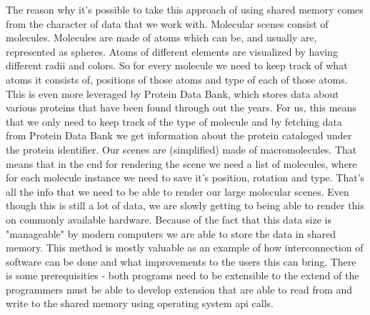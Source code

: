 \documentclass[
  digital, %
  table,   %
  lof,     %
  lot,     %
]{fithesis3}
\begin{document}
The reason why it's possible to take this approach of using shared memory comes from the character of data that we work with. Molecular scenes consist of molecules. Molecules are made of atoms which can be, and usually are, represented as spheres. Atoms of different elements are visualized by having different radii and colors. So for every molecule we need to keep track of what atoms it consists of, positions of those atoms and type of each of those atoms. This is even more leveraged by Protein Data Bank, which stores data about various proteins that have been found through out the years. For us, this means that we only need to keep track of the type of molecule and by fetching data from Protein Data Bank we get information about the protein cataloged under the protein identifier. Our scenes are (simplified) made of macromolecules. That means that in the end for rendering the scene we need a list of molecules, where for each molecule instance we need to save it's position, rotation and type. That's all the info that we need to be able to render our large molecular scenes. Even though this is still a lot of data, we are slowly getting to being able to render this on commonly available hardware. Because of the fact that this data size is "manageable" by modern computers we are able to store the data in shared memory.
This method is mostly valuable as an example of how interconnection of software can be done and what improvements to the users this can bring. There is some prerequisities - both programs need to be extensible to the extend of the programmers must be able to develop extension that are able to read from and write to the shared memory using operating system api calls.
\end{document}
